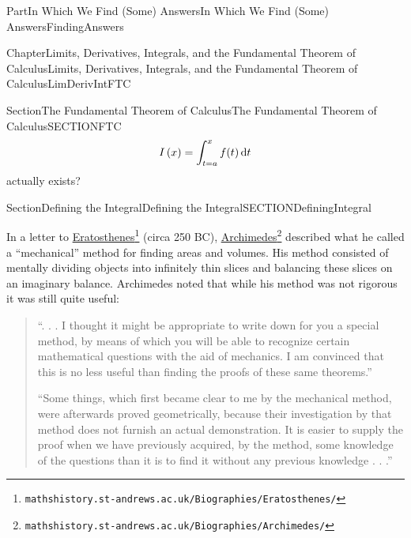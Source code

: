 \documentclass[oneside,10pt,]{book}
\numberwithin{equation}{part}
\newcommand{\dx}[1]{\,{\rm d}#1}
\begin{document}
\begin{partptx}{Part}{In Which We Find (Some) Answers}{}{In Which We Find (Some) Answers}{}{}{FindingAnswers}
\begin{chapterptx}{Chapter}{Limits, Derivatives, Integrals, and the Fundamental Theorem of Calculus}{}{Limits, Derivatives, Integrals, and the Fundamental Theorem of Calculus}{}{}{LimDerivIntFTC}
\begin{sectionptx}{Section}{The Fundamental Theorem of Calculus}{}{The Fundamental Theorem of Calculus}{}{}{SECTIONFTC}
\begin{equation*}
I\left(x\right)=\int^x_{t=a}{f(t)\dx{t}}
\end{equation*}
actually exists?%
\end{sectionptx}
%
%
\typeout{************************************************}
\typeout{************************************************}
%
\begin{sectionptx}{Section}{Defining the Integral}{}{Defining the Integral}{}{}{SECTIONDefiningIntegral}
\begin{introduction}{}%
 In a letter to \href{https://mathshistory.st-andrews.ac.uk/Biographies/Eratosthenes/}{Eratosthenes}\footnote{\nolinkurl{mathshistory.st-andrews.ac.uk/Biographies/Eratosthenes/}\label{SECTIONDefiningIntegral-2-1-2}} (circa 250 BC), \href{https://mathshistory.st-andrews.ac.uk/Biographies/Archimedes/}{Archimedes}\footnote{\nolinkurl{mathshistory.st-andrews.ac.uk/Biographies/Archimedes/}\label{SECTIONDefiningIntegral-2-1-4}} described what he called a ``mechanical'' method for finding areas and volumes.  His method consisted of mentally dividing objects into infinitely thin slices and balancing these slices on an imaginary balance.  Archimedes noted that while his method was not rigorous it was still quite useful:%
\begin{quote}%
``. . . I thought it might be appropriate to write down for you a special method, by means of which you will be able to recognize certain mathematical questions with the aid of mechanics.  I am convinced that this is no less useful than finding the proofs of these same theorems.''%
\par
``Some things, which first became clear to me by the mechanical method, were afterwards proved geometrically, because their investigation by that method does not furnish an actual demonstration.  It is easier to supply the proof when we have previously acquired, by the method, some knowledge of the questions than it is to find it without any previous knowledge . . .''%
\end{quote}

\end{introduction}
\end{sectionptx}
\end{chapterptx}
\end{partptx}
\end{document}
